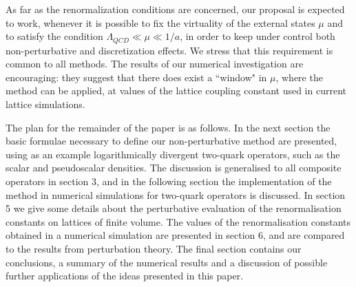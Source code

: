 As far as the renormalization conditions are concerned,
our proposal is expected to work, whenever it is  possible to
fix the virtuality of the external states $\mu$ and to satisfy
the condition $ \Lambda_{QCD} \ll \mu \ll 1/a $, in order
to keep under control both non-perturbative and discretization effects.
We stress that this  requirement is common to all methods.
The results of our numerical investigation
are encouraging: they suggest that there does exist a ``window" in $\mu$,
where the method can be applied,
at values of the lattice coupling constant used in
current lattice simulations.

The plan for the remainder of the paper is as follows. In the next
section the basic formulae necessary to define our non-perturbative
method are presented, using as an example logarithmically divergent
two-quark operators, such as the scalar and pseudoscalar densities. The
discussion is generalised to all composite operators in section 3, and
in the following section the implementation of the method in numerical
simulations for two-quark operators is discussed. In section 5 we give
some details about the perturbative evaluation of the renormalisation
constants on lattices of finite volume. The values of the
renormalisation constants obtained in a numerical simulation are
presented in section 6, and are compared to the results from
perturbation theory. The final section contains our conclusions, a
summary of the numerical results and a discussion of possible further
applications of the ideas presented in this paper.
